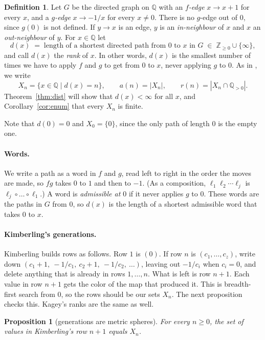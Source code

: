 \documentclass[11pt]{article}
\newtheorem{proposition}[theorem]{Proposition}
\theoremstyle{definition}
\newtheorem{definition}[theorem]{Definition}
\theoremstyle{remark}
\newcommand{\Q}{\mathbb{Q}}
\newcommand{\Z}{\mathbb{Z}}
\newcommand{\Qpos}{\Q_{>0}}
\begin{document}
\begin{definition}\label{def:dist}
Let $G$ be the directed graph on $\Q$ with an \emph{$f$-edge} $x\to x+1$ for every $x$, and a
\emph{$g$-edge} $x\to-1/x$ for every $x\neq0$. There is no $g$-edge out of $0$, since $g(0)$ is
not defined. If $y\to x$ is an edge, $y$ is an \emph{in-neighbour} of $x$ and $x$ an
\emph{out-neighbour} of $y$. For $x\in\Q$ let
\[
d(x)\;=\;\text{length of a shortest directed path from $0$ to $x$ in }G \;\in\;\Z_{\ge0}\cup\{\infty\},
\]
and call $d(x)$ the \emph{rank} of $x$. In other words, $d(x)$ is the smallest number of times we
have to apply $f$ and $g$ to get from $0$ to $x$, never applying $g$ to $0$. As in
\cite{kagey-mse}, we write
\[
X_n=\{x\in\Q\mid d(x)=n\},\qquad a(n)=|X_n|,\qquad r(n)=|X_n\cap\Qpos| .
\]
Theorem~\ref{thm:dist} will show that $d(x)<\infty$ for all $x$, and Corollary~\ref{cor:enum} that
every $X_n$ is finite.
\end{definition}

Note that $d(0)=0$ and $X_0=\{0\}$, since the only path of length $0$ is the empty one.

\paragraph{Words.}
We write a path as a word in $f$ and $g$, read left to right in the order the moves are made, so
$fg$ takes $0$ to $1$ and then to $-1$. (As a composition, $\ell_1\ell_2\cdots\ell_j$ is
$\ell_j\circ\dots\circ\ell_1$.) A word is \emph{admissible at $0$} if it never applies $g$ to $0$.
These words are the paths in $G$ from $0$, so $d(x)$ is the length of a shortest admissible word
that takes $0$ to $x$.

\paragraph{Kimberling's generations.}
Kimberling \cite{oeisA226247} builds rows as follows. Row $1$ is $(0)$. If row $n$ is
$(c_1,\dots,c_z)$, write down $\left(c_1+1,\ -1/c_1,\ c_2+1,\ -1/c_2,\ \dots\right)$, leaving out
$-1/c_i$ when $c_i=0$, and delete anything that is already in rows $1,\dots,n$. What is left is
row $n+1$. Each value in row $n+1$ gets the color of the map that produced it. This is
breadth-first search from $0$, so the rows should be our sets $X_n$. The next proposition checks
this. Kagey's ranks \cite{kagey137} are the same as well.

\begin{proposition}[generations are metric spheres]\label{prop:rows}
For every $n\ge0$, the set of values in Kimberling's row $n+1$ equals $X_n$.
\end{proposition}
\end{document}
